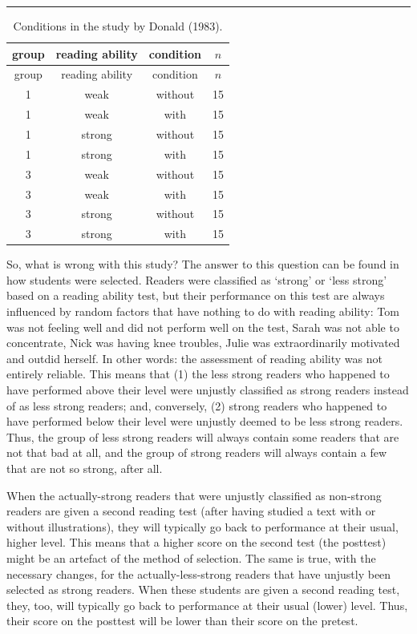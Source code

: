 \documentclass[
]{book}
\begin{document}
\begin{center}\rule{0.5\linewidth}{0.5pt}\end{center}

\begin{longtable}[]{@{}cccc@{}}
\caption{\label{tab:designDona83} Conditions in the study by Donald (1983).}\tabularnewline
\toprule
group & reading ability & condition & \(n\)\tabularnewline
\midrule
\endfirsthead
\toprule
group & reading ability & condition & \(n\)\tabularnewline
\midrule
\endhead
1 & weak & without & 15\tabularnewline
1 & weak & with & 15\tabularnewline
1 & strong & without & 15\tabularnewline
1 & strong & with & 15\tabularnewline
3 & weak & without & 15\tabularnewline
3 & weak & with & 15\tabularnewline
3 & strong & without & 15\tabularnewline
3 & strong & with & 15\tabularnewline
\bottomrule
\end{longtable}

So, what is wrong with this study? The answer to this question can be found in how students were selected. Readers were classified as `strong' or `less strong' based on a reading ability test, but their performance on this test are always influenced by random factors that have nothing to do with reading ability: Tom was not feeling well and did not perform well on the test, Sarah was not able to concentrate, Nick was having knee troubles, Julie was extraordinarily motivated and outdid herself. In other words: the assessment of reading ability was not entirely reliable. This means that (1) the less strong readers who happened to have performed above their level were unjustly classified as strong readers instead of as less strong readers; and, conversely, (2) strong readers who happened to have performed below their level were unjustly deemed to be less strong readers. Thus, the group of less strong readers will always contain some readers that are not that bad at all, and the group of strong readers will always contain a few that are not so strong, after all.

When the actually-strong readers that were unjustly classified as non-strong readers are given a second reading test (after having studied a text with or without illustrations), they will typically go back to performance at their usual, higher level. This means that a higher score on the second test (the posttest) might be an artefact of the method of selection. The same is true, with the necessary changes, for the actually-less-strong readers that have unjustly been selected as strong readers. When these students are given a second reading test, they, too, will typically go back to performance at their usual (lower) level. Thus, their score on the posttest will be lower than their score on the pretest.
\end{document}
